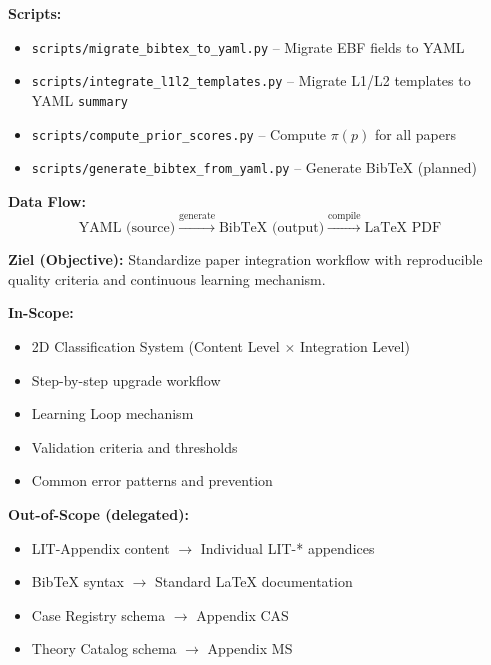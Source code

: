 \begin{tcolorbox}[colback=green!5!white, colframe=green!75!black,
    title=\textbf{SSOT Data Architecture: Paper Database}]
\textbf{Scripts:}
\begin{itemize}[nosep]
    \item \texttt{scripts/migrate\_bibtex\_to\_yaml.py} -- Migrate EBF fields to YAML
    \item \texttt{scripts/integrate\_l1l2\_templates.py} -- Migrate L1/L2 templates to YAML \texttt{summary}
    \item \texttt{scripts/compute\_prior\_scores.py} -- Compute $\pi(p)$ for all papers
    \item \texttt{scripts/generate\_bibtex\_from\_yaml.py} -- Generate BibTeX (planned)
\end{itemize}

\textbf{Data Flow:}
\begin{equation}
\text{YAML (source)} \xrightarrow{\text{generate}} \text{BibTeX (output)} \xrightarrow{\text{compile}} \text{LaTeX PDF}
\end{equation}

\end{tcolorbox}


\begin{tcolorbox}[
    colback=orange!5!white,
    colframe=orange!75!black,
    title={\textbf{Appendix Scope: Ziel / In-Scope / Out-of-Scope}},
    fonttitle=\bfseries
]

\textbf{Ziel (Objective):}
Standardize paper integration workflow with reproducible quality criteria and
continuous learning mechanism.

\vspace{0.3cm}
\textbf{In-Scope:}
\begin{itemize}[nosep]
    \item 2D Classification System (Content Level $\times$ Integration Level)
    \item Step-by-step upgrade workflow
    \item Learning Loop mechanism
    \item Validation criteria and thresholds
    \item Common error patterns and prevention
\end{itemize}

\vspace{0.3cm}
\textbf{Out-of-Scope (delegated):}
\begin{itemize}[nosep]
    \item LIT-Appendix content $\rightarrow$ Individual LIT-* appendices
    \item BibTeX syntax $\rightarrow$ Standard LaTeX documentation
    \item Case Registry schema $\rightarrow$ Appendix CAS
    \item Theory Catalog schema $\rightarrow$ Appendix MS
\end{itemize}

\end{tcolorbox}

